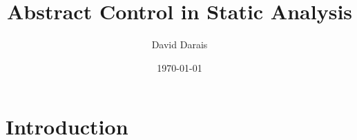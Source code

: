 \documentclass{article}
\title{Abstract Control in Static Analysis}
\author{David Darais}
\date{\today}
\begin{document}
\maketitle


\begin{abstract}
\end{abstract}

\tableofcontents

\section{Introduction}
\label{section:Introduction}

% 
% 
\end{document}
